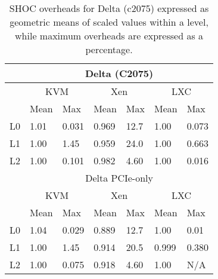 \begin{table*}
\footnotesize
\caption{SHOC overheads  for Delta (c2075) expressed as geometric means of scaled values within a
level, while maximum overheads are expressed as a percentage.  }
\label{C2075MEANS}
\centering
    \begin{tabular}{|l|l|l|l|l|l|l|}
    \hline 
    ~  &  \multicolumn{6}{c|}{Delta (C2075)} \\ \hline
    ~  & \multicolumn{2}{c|}{KVM} & \multicolumn{2}{c|}{Xen} & \multicolumn{2}{c|}{LXC}  \\ \hline 
    ~  & Mean   & Max & Mean & Max & Mean & Max  \\ \hline 
    L0 & 1.01     & 0.031   & 0.969    & 12.7  & 1.00  & 0.073      \\ \hline 
    L1 & 1.00     & 1.45    & 0.959    & 24.0  & 1.00  & 0.663      \\ \hline 
    L2 & 1.00     & 0.101   & 0.982    & 4.60  & 1.00  & 0.016      \\ \hline
    ~  &  \multicolumn{6}{c|}{Delta PCIe-only} \\ \hline
    ~  & \multicolumn{2}{c|}{KVM} & \multicolumn{2}{c|}{Xen} & \multicolumn{2}{c|}{LXC} \\ \hline 
    ~  & Mean   & Max & Mean & Max & Mean & Max  \\ \hline 
    L0 & 1.04     & 0.029   & 0.889    & 12.7  & 1.00  & 0.01     \\ \hline 
    L1 & 1.00     & 1.45    & 0.914    & 20.5  & 0.999 & 0.380    \\ \hline 
    L2 & 1.00     & 0.075   & 0.918    & 4.60  & 1.00  & N/A     \\ \hline
    \end{tabular}
\end{table*}



